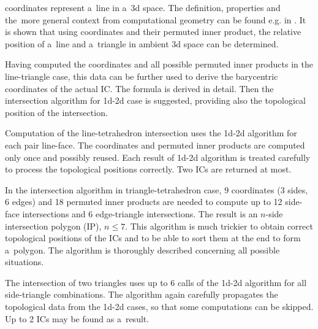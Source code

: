 \plucker coordinates represent a~line in a~3d space. The definition, properties and the~more general context from computational 
geometry can be found e.g. in \cite{joswig_plucker_2013}.
It is shown that using \plucker coordinates and their permuted inner product, the relative position of a~line and a~triangle
in ambient 3d space can be determined.


Having computed the \plucker coordinates and all possible permuted inner products in the line-triangle case,
this data can be further used to derive the barycentric coordinates of the actual IC.
The formula is derived in detail.
Then the intersection algorithm for 1d-2d case is suggested, providing also the topological position of the intersection.


Computation of the line-tetrahedron intersection uses the 1d-2d algorithm for each pair line-face.
The \plucker coordinates and permuted inner products are computed only once and possibly reused.
Each result of 1d-2d algorithm is treated carefully to process the topological positions correctly.
Two ICs are returned at most.


In the intersection algorithm in triangle-tetrahedron case, 9 \plucker coordinates (3 sides, 6 edges) and 18 permuted inner products
are needed to compute up to 12 side-face intersections and 6 edge-triangle intersections.
The result is an $n$-side intersection polygon (IP), $n\le 7$.
This algorithm is much trickier to obtain correct topological positions of the ICs and to be able to sort them at the end
to form a~polygon. The algorithm is thoroughly described concerning all possible situations.

The intersection of two triangles uses up to 6 calls of the 1d-2d algorithm for all side-triangle combinations.
The algorithm again carefully propagates the topological data from the 1d-2d cases, so that some computations can be skipped.
Up to 2 ICs may be found as a~result.


